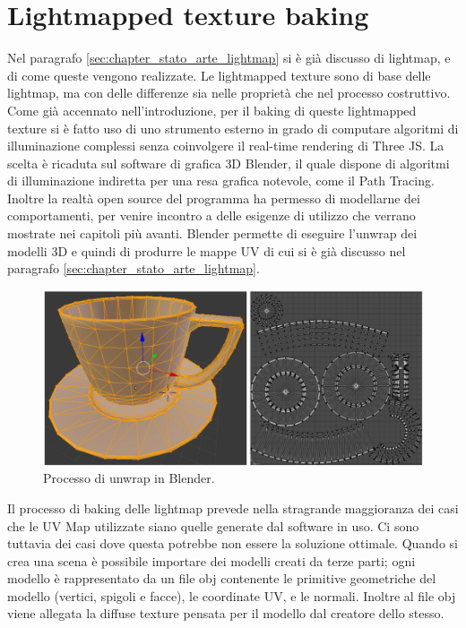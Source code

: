 \section{Lightmapped texture baking}
\label{sec:chapter_lrl_li_te_ba}

Nel paragrafo \ref{sec:chapter_stato_arte_lightmap} si è già discusso di lightmap, e di come queste vengono realizzate.
Le lightmapped texture sono di base delle lightmap, ma con delle differenze sia nelle proprietà che nel processo costruttivo. 
\\
Come già accennato nell’introduzione, per il baking di queste lightmapped texture si è fatto uso di uno strumento esterno in grado di computare algoritmi di illuminazione complessi senza coinvolgere il real-time rendering di Three JS. La scelta è ricaduta sul software di grafica 3D Blender, il quale dispone di algoritmi di illuminazione indiretta per una resa grafica notevole, come il Path Tracing. Inoltre la realtà open source del programma ha permesso di modellarne dei comportamenti, per venire incontro a delle esigenze di utilizzo che verrano mostrate nei capitoli più avanti. Blender permette di eseguire l’unwrap dei modelli 3D e quindi di produrre le mappe UV di cui si è già discusso nel paragrafo \ref{sec:chapter_stato_arte_lightmap}. 
\\
\begin{figure}[htb]
 \centering
 \includegraphics[width=1\linewidth]{images/chapter_lrl/lrl_unwrap.png}\hfill
 \caption[Blender unwrap]{Processo di unwrap in Blender.}
 \label{fig:lrl_unwrap}
\end{figure}
Il processo di baking delle lightmap prevede nella stragrande maggioranza dei casi che le UV Map utilizzate siano quelle generate dal software in uso. Ci sono tuttavia dei casi dove questa potrebbe non essere la soluzione ottimale.
Quando si crea una scena è possibile importare dei modelli creati da terze parti; ogni modello è rappresentato da un file obj contenente le primitive geometriche del modello (vertici, spigoli e facce), le coordinate UV, e le normali. Inoltre al file obj viene allegata la diffuse texture pensata per il modello dal creatore dello stesso.

